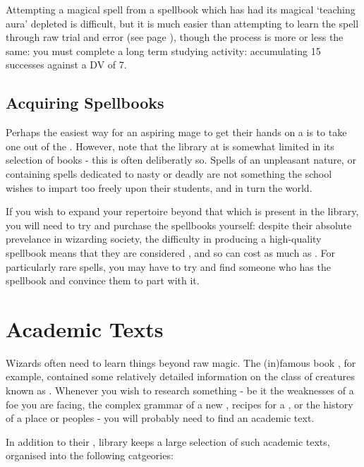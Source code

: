 Attempting a magical spell from a spellbook which has had its magical `teaching aura' depleted is difficult, but it is much easier than attempting to learn the spell through raw trial and error (see page \pageref{S:SpellLearn}), though the process is more or less the same: you must complete a long term studying activity: accumulating 15 successes against a DV of 7. 

\subsection{Acquiring Spellbooks}

Perhaps the easiest way for an aspiring mage to get their hands on a  is to take one out of the . However, note that the library at  is somewhat limited in its selection of books - this is often deliberatly so. Spells of an unpleasant nature, or containing spells dedicated to nasty  or deadly  are not something the school wishes to impart too freely upon their students, and in turn the world. 

If you wish to expand your repertoire beyond that which is present in the  library, you will need to try and purchase the spellbooks yourself: despite their absolute prevelance in wizarding society, the difficulty in producing a high-quality spellbook means that they are considered , and so can cost as much as . For particularly rare spells, you may have to try and find someone who has the spellbook and convince them to part with it. 

\section{Academic Texts}

Wizards often need to learn things beyond raw magic. The (in)famous book , for example, contained some relatively detailed information on the class of creatures known as . Whenever you wish to research something - be it the weaknesses of a foe you are facing, the complex grammar of a new , recipes for a , or the history of a place or peoples - you will probably need to find an academic text. 

In addition to their ,  library keeps a large selection of such academic texts, organised into the following catgeories:

